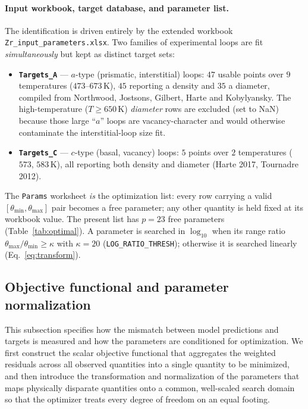 \documentclass{article}
\begin{document}
\paragraph{Input workbook, target database, and parameter list.}\label{sec:input}
The identification is driven entirely by the extended workbook
\texttt{Zr\_input\_parameters.xlsx}. Two families of experimental loops are fit
\emph{simultaneously} but kept as distinct target sets:
\begin{itemize}\itemsep2pt
\item \textbf{\texttt{Targets\_A}} --- $a$-type (prismatic, interstitial) loops:
$47$ usable points over $9$ temperatures ($473$--$673\,$K), $45$ reporting a
density and $35$ a diameter, compiled from Northwood, Jostsons, Gilbert, Harte
and Kobylyansky. The high-temperature ($T\!\ge\!650\,$K) \emph{diameter} rows are
excluded (set to NaN) because those large ``$a$'' loops are vacancy-character
and would otherwise contaminate the interstitial-loop size fit.
\item \textbf{\texttt{Targets\_C}} --- $c$-type (basal, vacancy) loops: $5$ points
over $2$ temperatures ($573$, $583\,$K), all reporting both density and diameter
(Harte 2017, Tournadre 2012).
\end{itemize}
The \texttt{Params} worksheet \emph{is} the optimization list: every row carrying
a valid $[\theta_{\min},\theta_{\max}]$ pair becomes a free parameter; any other
quantity is held fixed at its workbook value. The present list has $p=23$ free
parameters (Table~\ref{tab:optimal}). A parameter is searched in $\log_{10}$ when
its range ratio $\theta_{\max}/\theta_{\min}\ge\kappa$ with $\kappa=20$
(\texttt{LOG\_RATIO\_THRESH}); otherwise it is searched linearly
(Eq.~\eqref{eq:transform}).

\subsection{Objective functional and parameter normalization}\label{sec:objective}
This subsection specifies how the mismatch between model predictions and targets is measured and how the parameters are conditioned for optimization. We first construct the scalar objective functional that aggregates the weighted residuals across all observed quantities into a single quantity to be minimized, and then introduce the transformation and normalization of the parameters that maps physically disparate quantities onto a common, well-scaled search domain so that the optimizer treats every degree of freedom on an equal footing.
\end{document}
